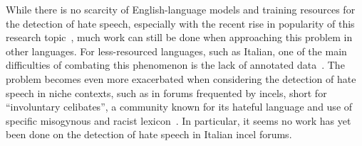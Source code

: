 \documentclass[11pt]{article}
\begin{document}

While there is no scarcity of English-language models and training resources for
the detection of hate speech, especially with the recent rise in popularity of
this research topic~\cite{alkomahLiteratureReviewTextual2022},
much work can still be done when approaching this problem in other languages.
For less-resourced languages, such as Italian, one of the main difficulties of combating this phenomenon is the lack of annotated data~\cite{van2023mitigating}. The problem becomes even more
exacerbated when considering the detection of hate speech in niche contexts,
such as in forums frequented by incels,
short for ``involuntary celibates'', a community known for its hateful language \cite{nagle-2017-kill-normies,jakiOnlineHatredWomen2019}
and use of
specific misogynous and racist lexicon~\cite{gothard2020exploring}.
In particular, it seems no work has yet been done on the detection of hate speech in Italian incel forums.
\end{document}
